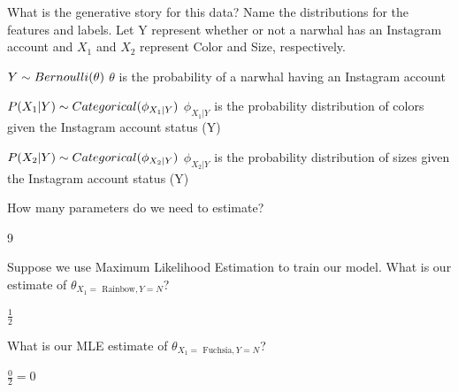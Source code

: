 \documentclass[11pt,addpoints,answers]{exam}
\begin{document}
\begin{questions}
\begin{parts}
\begin{subparts}
    \subpart[1] What is the generative story for this data? Name the distributions for the features and labels. Let Y represent whether or not a narwhal has an Instagram account and $X_1$ and $X_2$ represent Color and Size, respectively.

    \begin{your_solution}[width=5cm,height=5cm, title=Y]
        $Y \sim Bernoulli(\theta)\\$
        $\theta$ is the probability of a narwhal having an Instagram account
    \end{your_solution}
    \begin{your_solution}[width=4cm,height=5cm, title = $X_1|Y$]
        $P(X_1|Y)\\ \sim Categorical(\phi_{X_1|Y})\\$
        $\phi_{X_1|Y}$ is the probability distribution of colors given the Instagram account status (Y)
    \end{your_solution}
    \begin{your_solution}[width=4cm,height=5cm, title = $X_2|Y$]
        $P(X_2|Y)\\ \sim Categorical(\phi_{X_2|Y})\\$
        $\phi_{X_2|Y}$ is the probability distribution of sizes given the Instagram account status (Y)
    \end{your_solution}


    \subpart[1] How many parameters do we need to estimate? \\
    \begin{your_solution}[width=4cm,height=2cm]
    9
    \end{your_solution}


    \subpart[1] Suppose we use Maximum Likelihood Estimation to train our model. What is our estimate of $\theta_{X_1 = \text{ Rainbow}, Y = N}$? \\
    \begin{your_solution}[width=4cm,height=2cm]
    $\frac{1}{2}$
    \end{your_solution}


    \subpart[1] What is our MLE estimate of $\theta_{X_1 = \text{ Fuchsia}, Y = N}$? \\
    \begin{your_solution}[width=4cm,height=2cm]
    $\frac{0}{2} = 0$

    \end{your_solution}



\end{subparts}
\end{parts}
\end{questions}
\end{document}
